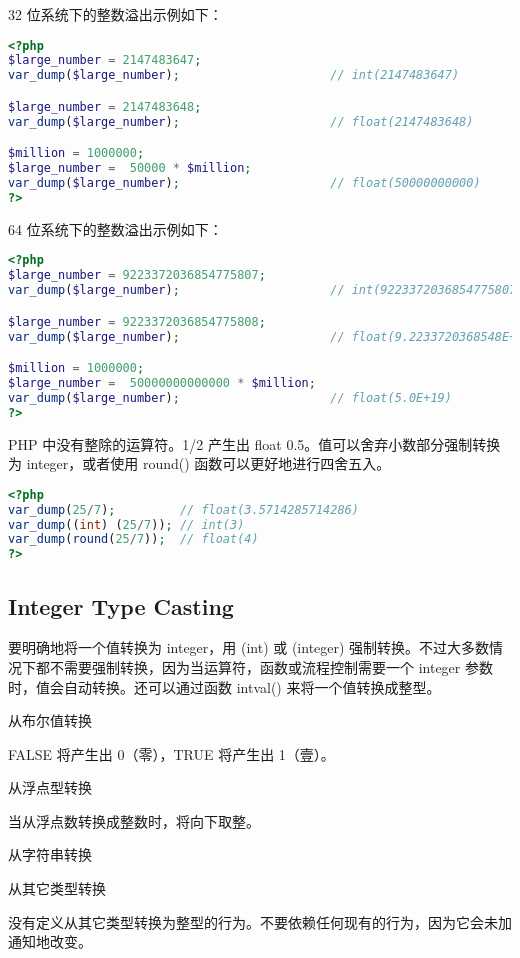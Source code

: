 32 位系统下的整数溢出示例如下：

\begin{lstlisting}[language=PHP]
<?php
$large_number = 2147483647;
var_dump($large_number);                     // int(2147483647)

$large_number = 2147483648;
var_dump($large_number);                     // float(2147483648)

$million = 1000000;
$large_number =  50000 * $million;
var_dump($large_number);                     // float(50000000000)
?>
\end{lstlisting}

64 位系统下的整数溢出示例如下：

\begin{lstlisting}[language=PHP]
<?php
$large_number = 9223372036854775807;
var_dump($large_number);                     // int(9223372036854775807)

$large_number = 9223372036854775808;
var_dump($large_number);                     // float(9.2233720368548E+18)

$million = 1000000;
$large_number =  50000000000000 * $million;
var_dump($large_number);                     // float(5.0E+19)
?>
\end{lstlisting}

PHP 中没有整除的运算符。1/2 产生出 float 0.5。值可以舍弃小数部分强制转换为 integer，或者使用 round() 函数可以更好地进行四舍五入。

\begin{lstlisting}[language=PHP]
<?php
var_dump(25/7);         // float(3.5714285714286) 
var_dump((int) (25/7)); // int(3)
var_dump(round(25/7));  // float(4) 
?>
\end{lstlisting}

\subsection{Integer Type Casting}


要明确地将一个值转换为 integer，用 (int) 或 (integer) 强制转换。不过大多数情况下都不需要强制转换，因为当运算符，函数或流程控制需要一个 integer 参数时，值会自动转换。还可以通过函数 intval() 来将一个值转换成整型。

\begin{compactitem}
\item 从布尔值转换

FALSE 将产生出 0（零），TRUE 将产生出 1（壹）。

\item 从浮点型转换

当从浮点数转换成整数时，将向下取整。

\item 从字符串转换

\item 从其它类型转换

没有定义从其它类型转换为整型的行为。不要依赖任何现有的行为，因为它会未加通知地改变。



\end{compactitem}


